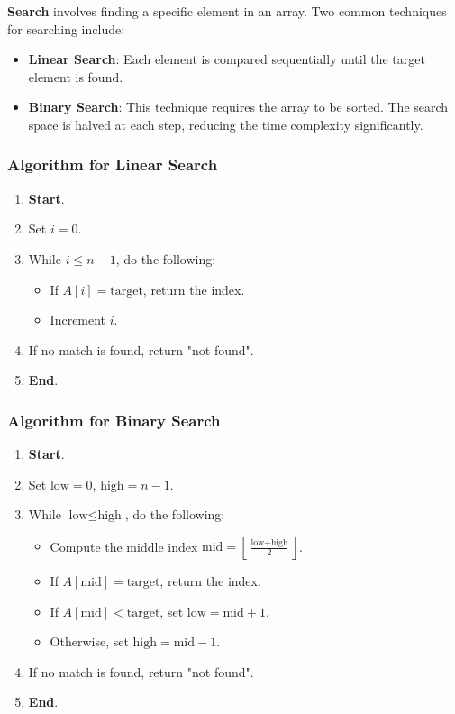 \documentclass{book}
\begin{document}
\textbf{Search} involves finding a specific element in an array. Two common techniques for searching include:

\begin{itemize}
	\item \textbf{Linear Search}: Each element is compared sequentially until the target element is found.
	\item \textbf{Binary Search}: This technique requires the array to be sorted. The search space is halved at each step, reducing the time complexity significantly.
\end{itemize}

\subsubsection*{Algorithm for Linear Search}

\begin{enumerate}
	\item \textbf{Start}.
	\item Set $i = 0$.
	\item While $i \leq n - 1$, do the following:
	\begin{itemize}
		\item If $A[i] = \text{target}$, return the index.
		\item Increment $i$.
	\end{itemize}
	\item If no match is found, return "not found".
	\item \textbf{End}.
\end{enumerate}

\subsubsection*{Algorithm for Binary Search}

\begin{enumerate}
	\item \textbf{Start}.
	\item Set $\text{low} = 0$, $\text{high} = n - 1$.
	\item While $\text{low} \leq \text{high}$, do the following:
	\begin{itemize}
		\item Compute the middle index $\text{mid} = \left\lfloor \frac{\text{low} + \text{high}}{2} \right\rfloor$.
		\item If $A[\text{mid}] = \text{target}$, return the index.
		\item If $A[\text{mid}] < \text{target}$, set $\text{low} = \text{mid} + 1$.
		\item Otherwise, set $\text{high} = \text{mid} - 1$.
	\end{itemize}
	\item If no match is found, return "not found".
	\item \textbf{End}.
\end{enumerate}
\end{document}
